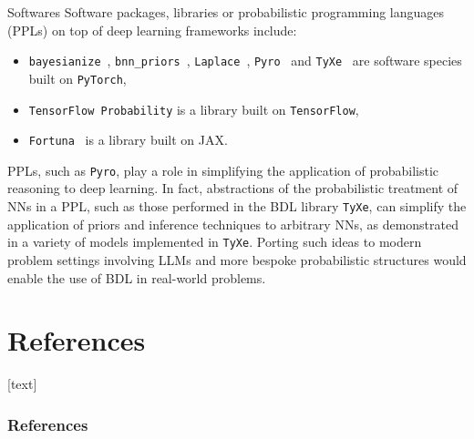 \documentclass[9pt]{beamer}
\begin{document}

\begin{frame}{Softwares}
Software packages, libraries or probabilistic programming languages (PPLs) on top of deep learning frameworks include:
\begin{itemize}
	\item \texttt{bayesianize}~\citep{ritter2021}, \texttt{bnn\_priors}~\citep{fortuin2021bnnpriors}, \texttt{Laplace}~\citep{daxberger2021b}, \texttt{Pyro}~\citep{bingham2019} and \texttt{TyXe}~\citep{ritter2022} are software species built on \texttt{PyTorch}, 
	\item \texttt{TensorFlow Probability} is a library built on \texttt{TensorFlow}, 
	\item \texttt{Fortuna}~\citep{detommaso2023fortuna} is a library built on JAX. %
\end{itemize}

PPLs, such as \texttt{Pyro}, play a role in simplifying the application of probabilistic reasoning to deep learning. In fact, abstractions of the probabilistic treatment of NNs in a PPL, such as those performed in the BDL library \texttt{TyXe}, can simplify the application of priors and inference techniques to arbitrary NNs, as demonstrated in a variety of models implemented in \texttt{TyXe}. Porting such ideas to modern problem settings involving LLMs and more bespoke probabilistic structures would enable the use of BDL in real-world problems. %
\end{frame}



\section*{References}
[text]%
\begin{frame}[allowframebreaks]
\frametitle{References}
\small


\normalsize
\end{frame}
\end{document}
